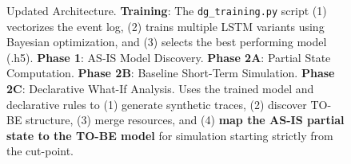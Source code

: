 \documentclass[a4paper]{article}
\begin{document}
\begin{figure}[H]
  \caption{Updated Architecture. \textbf{Training}: The \texttt{dg\_training.py} script (1) vectorizes the event log, (2) trains multiple LSTM variants using Bayesian optimization, and (3) selects the best performing model (.h5). \textbf{Phase 1}: AS-IS Model Discovery. \textbf{Phase 2A}: Partial State Computation. \textbf{Phase 2B}: Baseline Short-Term Simulation. \textbf{Phase 2C}: Declarative What-If Analysis. Uses the trained model and declarative rules to (1) generate synthetic traces, (2) discover TO-BE structure, (3) merge resources, and (4) \textbf{map the AS-IS partial state to the TO-BE model} for simulation starting strictly from the cut-point.}
  \label{fig:architecture}
\end{figure}
\end{document}
